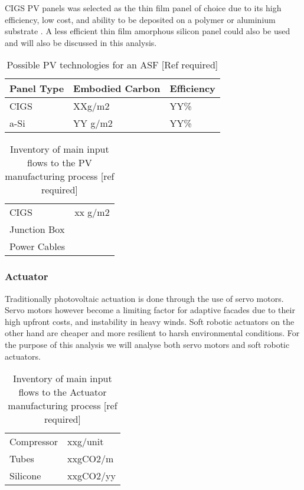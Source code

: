 CIGS PV panels was selected as the thin film panel of choice due to its high efficiency, low cost, and ability to be deposited on a polymer or aluminium substrate \cite{chirilua2011highly}. A less efficient thin film amorphous silicon panel could also be used and will also be discussed in this analysis.\\

\begin{table}[H]
\centering
\begin{tabular}{lll}
Panel Type		   & Embodied Carbon        & Efficiency     \\
\hline
CIGS 				 & XXg/m2 & YY\% \\
a-Si				 & YY g/m2        & YY\%    \\
\end{tabular}
\caption{Possible PV technologies for an ASF [Ref required]}
\label{tab:PV}
\end{table}

\begin{table}[H]
\centering
\begin{tabular}{ll}
\hline
CIGS         & xx g/m2 \\
Junction Box &         \\
Power Cables &         \\
\hline
\end{tabular}
\caption{Inventory of main input flows to the PV manufacturing process [ref required]}
\label{tab:PVinv}
\end{table}


\subsubsection*{Actuator}
Traditionally photovoltaic actuation is done through the use of servo motors. Servo motors however become a limiting factor for adaptive facades due to their high upfront costs, and instability in heavy winds. Soft robotic actuators on the other hand are cheaper and more resilient to harsh environmental conditions\cite{Svetozarevic2014a}. For the purpose of this analysis we will analyse both servo motors and soft robotic actuators. \\

\begin{table}[H]
\centering
\begin{tabular}{ll}
\hline
Compressor & xxg/unit  \\
Tubes      & xxgCO2/m  \\
Silicone   & xxgCO2/yy \\
\hline
\end{tabular}
\caption{Inventory of main input flows to the Actuator manufacturing process [ref required]}
\label{tab:ActuatorInv}
\end{table}

